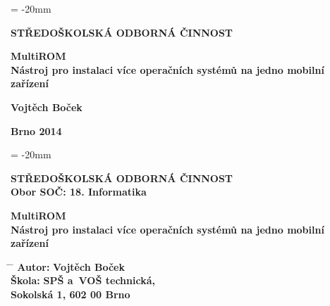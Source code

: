 \documentclass[12pt, a4paper, oneside]{article}
\newcommand{\B}{\textbf} %
\begin{document}

\pagestyle{empty} %
 
\voffset = -20mm %
\enlargethispage{60mm} %

\begin{center}
 
\Large \B{STŘEDOŠKOLSKÁ ODBORNÁ ČINNOST}

\vspace{60mm}

\Huge
\B{MultiROM} \\
\LARGE
\B{Nástroj pro instalaci více operačních systémů na jedno mobilní zařízení}

\Large

\vspace{90mm}


\B{Vojtěch Boček} \\

\vspace{40mm}

\B{Brno 2014}


\end{center}

\newpage %

\voffset = -20mm %
\enlargethispage{60mm} %

\begin{center}

\Large \B{STŘEDOŠKOLSKÁ ODBORNÁ ČINNOST}  \\
\vspace{10mm}
 \normalsize 
\B{Obor SOČ: 18. Informatika}

\vspace{45mm}

\Huge
\B{MultiROM} \\
\LARGE
\B{Nástroj pro instalaci více operačních systémů na jedno mobilní zařízení}
\end{center}
\large

\vspace{50mm}


\begin{tabbing}
\hspace{10mm} \= \hspace{30mm}  \=   \kill %
  \> \B{Autor:}  \> \B{Vojtěch Boček}        \\[8mm] 
  \> \B{Škola:}   \> \B{SPŠ a~VOŠ technická, }     \\
  \>              \> \B{Sokolská 1, 602 00 Brno}    \\[8mm]
\end{tabbing}
\end{document}
